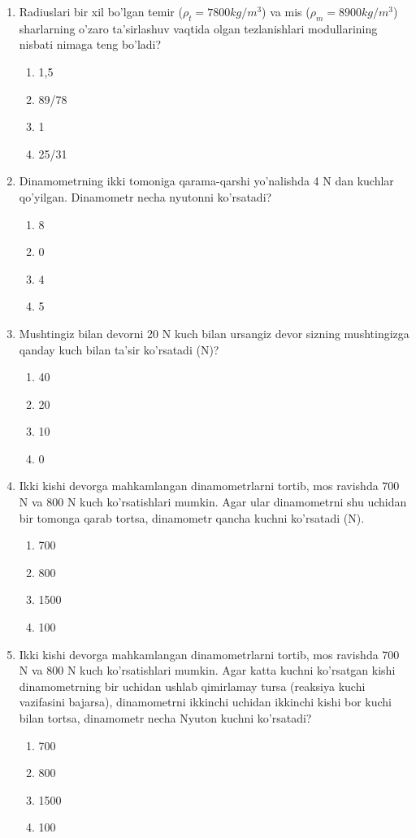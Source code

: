 \begin{enumerate}
\item Radiuslari bir xil bo'lgan temir ($\rho_t = 7800 kg/m^3$) va mis ($\rho_m = 8900 kg/m^3$) sharlarning o'zaro ta'sirlashuv vaqtida olgan tezlanishlari modullarining nisbati nimaga teng bo'ladi?
\begin{enumerate}[label=\Alph*)]
\item 1,5
\item 89/78
\item 1
\item 25/31
\end{enumerate}

\item Dinamometrning ikki tomoniga qarama-qarshi yo'nalishda 4 N dan kuchlar qo'yilgan. Dinamometr necha nyutonni ko'rsatadi?
\begin{enumerate}[label=\Alph*)]
\item 8
\item 0
\item 4
\item 5
\end{enumerate}

\item Mushtingiz bilan devorni 20 N kuch bilan ursangiz devor sizning mushtingizga qanday kuch bilan ta'sir ko'rsatadi (N)?
\begin{enumerate}[label=\Alph*)]
\item 40
\item 20
\item 10
\item 0
\end{enumerate}

\item Ikki kishi devorga mahkamlangan dinamometrlarni tortib, mos ravishda 700 N va 800 N kuch ko'rsatishlari mumkin. Agar ular dinamometrni shu uchidan bir tomonga qarab tortsa, dinamometr qancha kuchni ko'rsatadi (N).
\begin{enumerate}[label=\Alph*)]
\item 700
\item 800
\item 1500
\item 100
\end{enumerate}

\item Ikki kishi devorga mahkamlangan dinamometrlarni tortib, mos ravishda 700 N va 800 N kuch ko'rsatishlari mumkin. Agar katta kuchni ko'rsatgan kishi dinamometrning bir uchidan ushlab qimirlamay tursa (reaksiya kuchi vazifasini bajarsa), dinamometrni ikkinchi uchidan ikkinchi kishi bor kuchi bilan tortsa, dinamometr necha Nyuton kuchni ko'rsatadi?
\begin{enumerate}[label=\Alph*)]
\item 700
\item 800
\item 1500
\item 100
\end{enumerate}


\end{enumerate}
